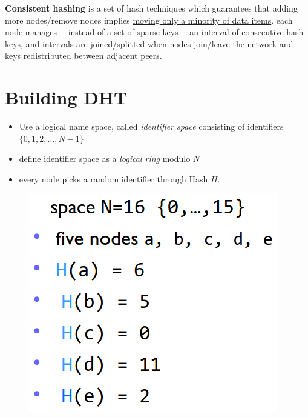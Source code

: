 \textbf{Consistent hashing} is a set of hash techniques which guarantees that adding more nodes/remove nodes implies \ul{moving only a minority of data items}.
each node manages ---instead of a set of sparse keys--- an interval of consecutive hash keys, and intervals are joined/splitted when nodes join/leave the network and keys redistributed between adjacent peers.


\section{Building DHT}
\begin{paracol}{2}
   \begin{itemize}
      \item Use a logical name space, called \textit{identifier space} consisting of identifiers
      $\{0,1,2,...,N-1\}$
      \item define identifier space as a \textit{logical ring} modulo $N$
      \item every node picks a random identifier
      through Hash $H$.
   \end{itemize}
   \begin{figure}[htbp]
      \centering
      \includegraphics{images/DHT_build2.png}
      \label{fig:DHT_build2}
   \end{figure}

   \switchcolumn
   

\end{paracol}
